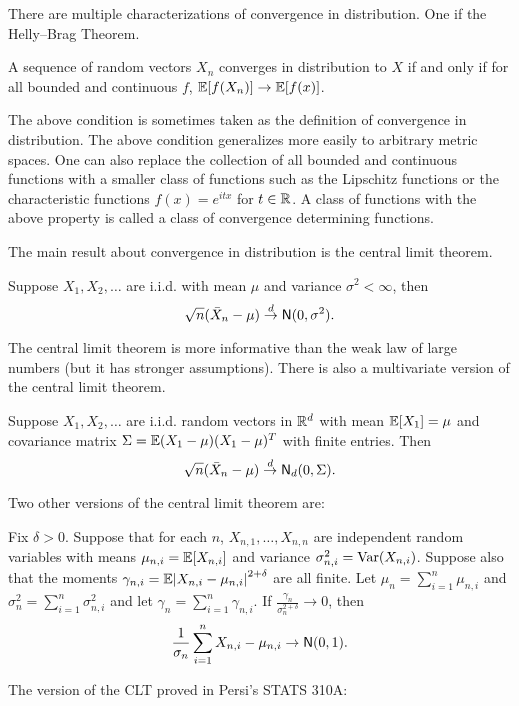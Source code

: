 There are multiple characterizations of convergence in distribution. One if the Helly--Brag Theorem.
\begin{lemma}
    A sequence of random vectors $X_n$ converges in distribution to $X$ if and only if for all bounded and continuous $f$, ${\mathbb{E}}[f(X_n)]\to {\mathbb{E}}[f(x)]$.
\end{lemma}
The above condition is sometimes taken as the definition of convergence in distribution. The above condition generalizes more easily to arbitrary metric spaces. One can also replace the collection of all bounded and continuous functions with a smaller class of functions such as the Lipschitz functions or the characteristic functions $f(x) = e^{itx}$ for $t \in {\mathbb R}$. A class of functions with the above property is called a class of convergence determining functions. 

The main result about convergence in distribution is the central limit theorem.
\begin{theorem}
    Suppose $X_1,X_2,\ldots $ are i.i.d. with mean $\mu$ and variance $\sigma^2 < \infty$, then 
    \[\sqrt{n}(\bar{X}_n - \mu) \stackrel{d}{\to} \mathsf{N}(0,\sigma^2).\]
\end{theorem}
The central limit theorem is more informative than the weak law of large numbers (but it has stronger assumptions). There is also a multivariate version of the central limit theorem.
\begin{theorem}
    Suppose $X_1,X_2,\ldots$ are i.i.d. random vectors in ${\mathbb R}^d$ with mean ${\mathbb{E}}[X_1]=\mu$ and covariance matrix $\Sigma = {\mathbb{E}}(X_1-\mu)(X_1-\mu)^T$ with finite entries. Then
    \[\sqrt{n}(\bar{X}_n-\mu)\stackrel{d}{\to} \mathsf{N}_d(0,\Sigma).\]
\end{theorem}

Two other versions of the central limit theorem are:
\begin{theorem}
    Fix $\delta > 0$. Suppose that for each $n$, $X_{n,1},\ldots,X_{n,n}$ are independent random variables with means $\mu_{n,i} = {\mathbb{E}}[X_{n,i}]$ and variance $\sigma_{n,i}^2 = \operatorname{Var}(X_{n,i})$. Suppose also that the moments $\gamma_{n,i} = {\mathbb{E}}{\left\lvert X_{n,i}-\mu_{n,i}\right\rvert}^{2+\delta}$ are all finite. Let $\mu_n = \sum_{i=1}^n \mu_{n,i}$ and $\sigma_n^2 = \sum_{i=1}^n \sigma_{n,i}^2$ and let $\gamma_n = \sum_{i=1}^n \gamma_{n,i}$. If $\frac{\gamma_n}{\sigma_n^{2+\delta}} \to 0$, then 
    \[\frac{1}{\sigma_n}\sum_{i=1}^n X_{n,i}-\mu_{n,i} \to \mathsf{N}(0,1). \]
\end{theorem}
The version of the CLT proved in Persi's STATS 310A:

